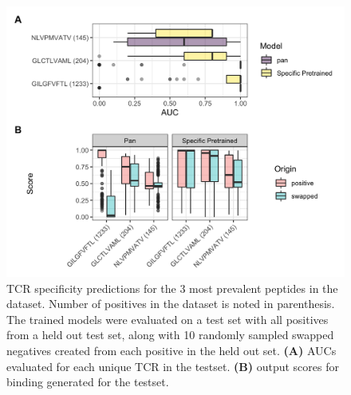 \begin{figure}
    \centering
    \includegraphics[width=\linewidth]{figures/pretrain_specificity.png}
    \caption{TCR specificity predictions for the 3 most prevalent peptides in the dataset. Number of positives in the dataset is noted in parenthesis. The trained models were evaluated on a test set with all positives from a held out test set, along with 10 randomly sampled swapped negatives created from each positive in the held out set. \textbf{(A)} AUCs evaluated for each unique TCR in the testset. \textbf{(B)} output scores for binding generated for the testset.}
    \label{fig:specificity_performance}
\end{figure}






